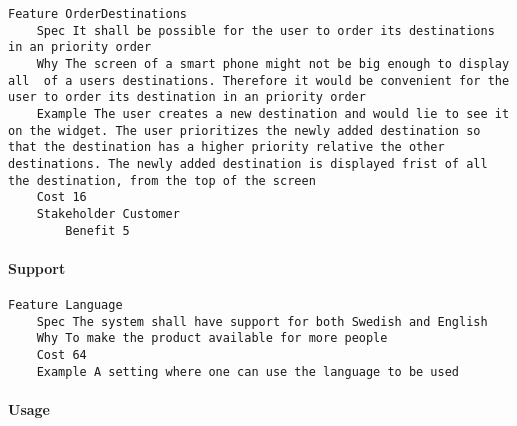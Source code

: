 \begin{lstlisting}
Feature OrderDestinations
	Spec It shall be possible for the user to order its destinations in an priority order
	Why The screen of a smart phone might not be big enough to display all	of a users destinations. Therefore it would be convenient for the user to order its destination in an priority order
	Example The user creates a new destination and would lie to see it on the widget. The user prioritizes the newly added destination so that the destination has a higher priority relative the other destinations. The newly added destination is displayed frist of all the destination, from the top of the screen
	Cost 16
	Stakeholder Customer
		Benefit 5

\end{lstlisting}
		
				
			 \paragraph{Support}


\begin{lstlisting}
Feature Language
	Spec The system shall have support for both Swedish and English
	Why To make the product available for more people
	Cost 64
	Example A setting where one can use the language to be used

\end{lstlisting}
		
				
			 \paragraph{Usage}


